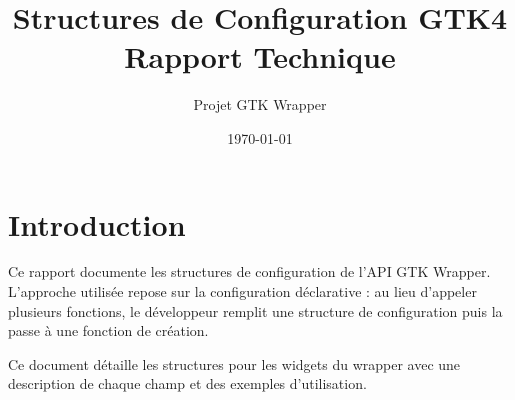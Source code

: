 \documentclass[12pt,a4paper]{article}
\title{Structures de Configuration GTK4 \\ Rapport Technique}
\author{Projet GTK Wrapper}
\date{\today}
\begin{document}
\maketitle

\tableofcontents

\newpage

\section{Introduction}
Ce rapport documente les structures de configuration de l'API GTK Wrapper. L'approche utilisée repose sur la configuration déclarative : au lieu d'appeler plusieurs fonctions, le développeur remplit une structure de configuration puis la passe à une fonction de création.

Ce document détaille les structures pour les widgets du wrapper avec une description de chaque champ et des exemples d'utilisation.

\newpage












\end{document}
